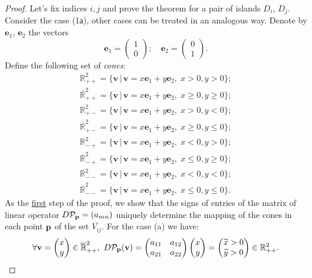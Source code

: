 \begin{proof}
	Let's fix indices $i, j$ and prove the theorem for a pair of islands $D_i$, $D_j$.
	Consider the case (1а), other cases can be treated in an analogous way.
	Denote by $\mathbf{e}_1$, $\mathbf{e}_2$ the vectors
	\begin{equation}
		\mathbf{e}_1 = \begin{pmatrix} 1 \\ 0 \end{pmatrix}; \quad \mathbf{e}_2 = \begin{pmatrix} 0 \\ 1 \end{pmatrix}.
	\end{equation}
	Define the following set of {\it cones}:
	\begin{align*}
		\mathbb{R}_{++}^2 = \{ \mathbf{v} \, | \, \mathbf{v} = x \mathbf{e}_1 + y \mathbf{e}_2, \; x > 0, y > 0 \}; \\
		\overline{\mathbb{R}}_{++}^2 = \{ \mathbf{v} \, | \, \mathbf{v} = x \mathbf{e}_1 + y \mathbf{e}_2, \; x \ge 0, y \ge 0 \}; \\
		\mathbb{R}_{+-}^2 = \{ \mathbf{v} \, | \, \mathbf{v} = x \mathbf{e}_1 + y \mathbf{e}_2, \; x > 0, y < 0 \}; \\
		\overline{\mathbb{R}}_{+-}^2 = \{ \mathbf{v} \, | \, \mathbf{v} = x \mathbf{e}_1 + y \mathbf{e}_2, \; x \ge 0, y \le 0 \}; \\
		\mathbb{R}_{-+}^2 = \{ \mathbf{v} \, | \, \mathbf{v} = x \mathbf{e}_1 + y \mathbf{e}_2, \; x < 0, y > 0 \}; \\
		\overline{\mathbb{R}}_{-+}^2 = \{ \mathbf{v} \, | \, \mathbf{v} = x \mathbf{e}_1 + y \mathbf{e}_2, \; x \le 0, y \ge 0 \}; \\
		\mathbb{R}_{--}^2 = \{ \mathbf{v} \, | \, \mathbf{v} = x \mathbf{e}_1 + y \mathbf{e}_2, \; x < 0, y < 0 \}; \\
		\overline{\mathbb{R}}_{--}^2 = \{ \mathbf{v} \, | \, \mathbf{v} = x \mathbf{e}_1 + y \mathbf{e}_2, \; x \le 0, y \le 0 \}.
	\end{align*}
	As the \underline{first} step of the proof, we show that the signs of entries of the matrix of linear operator $D \mathcal{P}_{\vb{p}} = ( a_{mn} )$ uniquely determine the mapping of the cones in each point $\vb{p}$ of the set $\overline{V_{ij}}$.
	For the case (a) we have:
	\begin{equation*}
	\forall \mathbf{v} = \begin{pmatrix} x \\ y \end{pmatrix} \in \overline{\mathbb{R}}_{++}^2, \ D \mathcal{P}_{\vb{p}}(\mathbf{v}) = \begin{pmatrix} a_{11} & a_{12} \\ a_{21} & a_{22} \end{pmatrix} \begin{pmatrix} x \\ y \end{pmatrix} = \begin{pmatrix} \widetilde{x} > 0 \\ \widetilde{y} > 0\end{pmatrix} \in \mathbb{R}_{++}^2.	

\end{equation*}
\end{proof}

